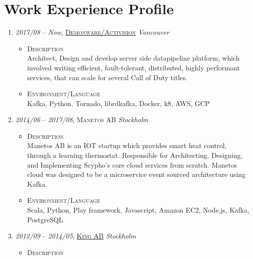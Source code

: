 \documentclass[a4paper,10pt]{article}
\begin{document}
  \section{Work Experience Profile}
  \begin{enumerate}

  \item \emph{2017/08} – \emph{Now}, \textsc{\href{https://www.demonware.net/}{Demonware/Activision}} \emph {Vancouver}\\

  \begin{itemize}
    \item \textsc{Description} \\
      Architect, Design and develop server side datapipeline platform,
      which involved writing efficient, fault-tolerant, distributed,
      highly performant services, that can scale for several Call of Duty titles.
      
  \item \textsc{Environment/Language} \\
    Kafka, Python, Tornado, librdkafka, Docker, k8, AWS, GCP

  \end{itemize}


\item \emph{2014/06} – \emph{2017/08}, \textsc{Manetos AB} \emph {Stockholm} \\
    
  \begin{itemize}
    \item \textsc{Description} \\
      Manetos AB is an IOT startup which provides smart heat control, through a learning thermostat. Responsible for Architecting, Designing, and Implementing Scypho's core cloud services from scratch. Manetos cloud was designed to be a microservice event sourced architecture using Kafka.
   
  \item \textsc{Environment/Language} \\
    Scala, Python, Play framework, Javascript, Amazon EC2, Node.js, Kafka, PostgreSQL

 \end{itemize}
   
\item \emph{2012/09} – \emph{2014/05}, \textsc{\href{www.king.com}{King AB}} \emph{Stockholm} \\
  \begin{itemize}
    \item \textsc{Description} \\
  

\end{itemize}
\end{enumerate}
\end{document}
